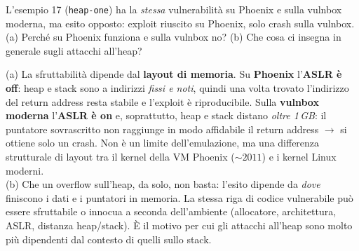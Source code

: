 \question[5]
L'esempio 17 (\lstinline|heap-one|) ha la \emph{stessa} vulnerabilità su Phoenix e sulla vulnbox moderna, ma esito opposto: exploit riuscito su Phoenix, solo crash sulla vulnbox. (a) Perché su Phoenix funziona e sulla vulnbox no? (b) Che cosa ci insegna in generale sugli attacchi all'heap?
\begin{solution}
(a) La sfruttabilità dipende dal \textbf{layout di memoria}. Su \textbf{Phoenix} l'\textbf{ASLR è off}: heap e stack sono a indirizzi \emph{fissi e noti}, quindi una volta trovato l'indirizzo del return address resta stabile e l'exploit è riproducibile. Sulla \textbf{vulnbox moderna} l'\textbf{ASLR è on} e, soprattutto, heap e stack distano \emph{oltre 1\,GB}: il puntatore sovrascritto non raggiunge in modo affidabile il return address $\to$ si ottiene solo un crash. Non è un limite dell'emulazione, ma una differenza strutturale di layout tra il kernel della VM Phoenix (${\sim}2011$) e i kernel Linux moderni.\\
(b) Che un overflow sull'heap, da solo, non basta: l'esito dipende da \emph{dove} finiscono i dati e i puntatori in memoria. La stessa riga di codice vulnerabile può essere sfruttabile o innocua a seconda dell'ambiente (allocatore, architettura, ASLR, distanza heap/stack). È il motivo per cui gli attacchi all'heap sono molto più dipendenti dal contesto di quelli sullo stack.
\end{solution}
